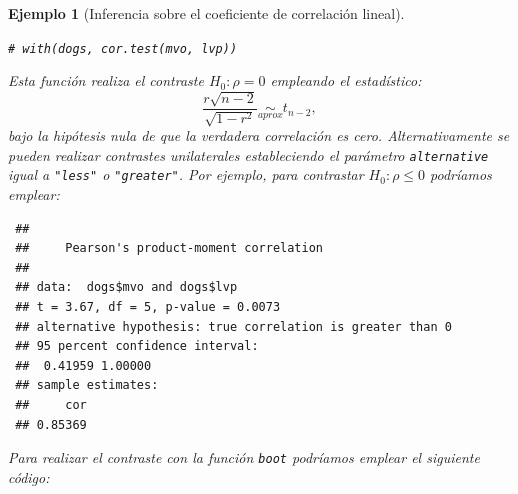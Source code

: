 \documentclass[
  spanish,
  10pt,
]{book}
\newenvironment{Shaded}{\begin{snugshade}}{\end{snugshade}}
\newcommand{\AttributeTok}[1]{\textcolor[rgb]{0.13,0.29,0.53}{#1}}
\newcommand{\CommentTok}[1]{\textcolor[rgb]{0.56,0.35,0.01}{\textit{#1}}}
\newcommand{\ControlFlowTok}[1]{\textcolor[rgb]{0.13,0.29,0.53}{\textbf{#1}}}
\newcommand{\DecValTok}[1]{\textcolor[rgb]{0.00,0.00,0.81}{#1}}
\newcommand{\FunctionTok}[1]{\textcolor[rgb]{0.13,0.29,0.53}{\textbf{#1}}}
\newcommand{\NormalTok}[1]{#1}
\newcommand{\OtherTok}[1]{\textcolor[rgb]{0.56,0.35,0.01}{#1}}
\newcommand{\SpecialCharTok}[1]{\textcolor[rgb]{0.81,0.36,0.00}{\textbf{#1}}}
\newcommand{\StringTok}[1]{\textcolor[rgb]{0.31,0.60,0.02}{#1}}
\theoremstyle{break}
\newtheorem{example}{Ejemplo}[chapter]
\theoremstyle{nonumberplain}
\renewcommand{\CommentTok}[1]{\textcolor[rgb]{0.41,0.41,0.41}{\texttt{#1}}}
\begin{document}
\begin{example}[Inferencia sobre el coeficiente de correlación lineal]
\begin{Shaded}
\begin{Highlighting}[]
\CommentTok{\# with(dogs, cor.test(mvo, lvp))}
\end{Highlighting}
\end{Shaded}

Esta función realiza el contraste \(H_0: \rho = 0\) empleando el estadístico:
\[\frac{r\sqrt{n - 2}}{\sqrt{1 - r^2}} \underset{aprox}{\sim } t_{n-2},\]
bajo la hipótesis nula de que la verdadera correlación es cero.
Alternativamente se pueden realizar contrastes unilaterales estableciendo
el parámetro \texttt{alternative} igual a \texttt{"less"} o \texttt{"greater"}.
Por ejemplo, para contrastar \(H_0: \rho \leq 0\) podríamos emplear:

\begin{Shaded}
\end{Shaded}

\begin{verbatim}
 ## 
 ##     Pearson's product-moment correlation
 ## 
 ## data:  dogs$mvo and dogs$lvp
 ## t = 3.67, df = 5, p-value = 0.0073
 ## alternative hypothesis: true correlation is greater than 0
 ## 95 percent confidence interval:
 ##  0.41959 1.00000
 ## sample estimates:
 ##     cor 
 ## 0.85369
\end{verbatim}

Para realizar el contraste con la función \texttt{boot} podríamos
emplear el siguiente código:

\begin{Shaded}
\end{Shaded}


\end{example}
\end{document}
